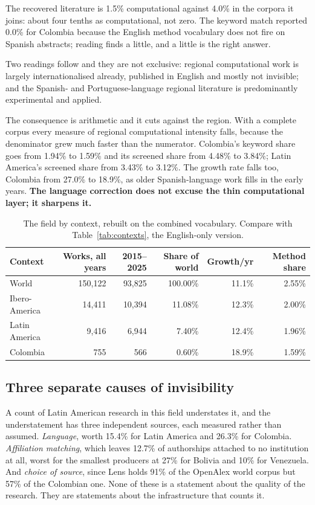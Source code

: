 \documentclass[11pt,a4paper]{article}
\begin{document}
The recovered literature is 1.5\% computational against 4.0\% in the corpora it joins:
about four tenths as computational, not zero. The keyword match reported 0.0\% for Colombia
because the English method vocabulary does not fire on Spanish abstracts; reading finds a
little, and a little is the right answer.

Two readings follow and they are not exclusive: regional computational work is largely
internationalised already, published in English and mostly not invisible; and the Spanish-
and Portuguese-language regional literature is predominantly experimental and applied.

The consequence is arithmetic and it cuts against the region. With a complete corpus every
measure of regional computational intensity falls, because the denominator grew much faster
than the numerator. Colombia's keyword share goes from 1.94\% to 1.59\% and its screened
share from 4.48\% to 3.84\%; Latin America's screened share from 3.43\% to 3.12\%. The
growth rate falls too, Colombia from 27.0\% to 18.9\%, as older Spanish-language work fills
in the early years. \textbf{The language correction does not excuse the thin computational
layer; it sharpens it.}


\begin{table}[htbp]
\centering
\caption{The field by context, rebuilt on the combined vocabulary. Compare with
Table~\ref{tab:contexts}, the English-only version.}
\label{tab:contexts-combined}
\small
\begin{tabular}{lrrrrr}
\toprule
Context & Works, all years & 2015--2025 & Share of world & Growth/yr & Method share \\
\midrule
World & 150,122 & 93,825 & 100.00\% & 11.1\% & 2.55\% \\
Ibero-America & 14,411 & 10,394 & 11.08\% & 12.3\% & 2.00\% \\
Latin America & 9,416 & 6,944 & 7.40\% & 12.4\% & 1.96\% \\
Colombia & 755 & 566 & 0.60\% & 18.9\% & 1.59\% \\
\bottomrule
\end{tabular}
\end{table}


\subsection{Three separate causes of invisibility}

A count of Latin American research in this field understates it, and the understatement has
three independent sources, each measured rather than assumed. \emph{Language}, worth 15.4\%
for Latin America and 26.3\% for Colombia. \emph{Affiliation matching}, which leaves 12.7\%
of authorships attached to no institution at all, worst for the smallest producers at 27\%
for Bolivia and 10\% for Venezuela. And \emph{choice of source}, since Lens holds 91\% of
the OpenAlex world corpus but 57\% of the Colombian one. None of these is a statement about
the quality of the research. They are statements about the infrastructure that counts it.
\end{document}
